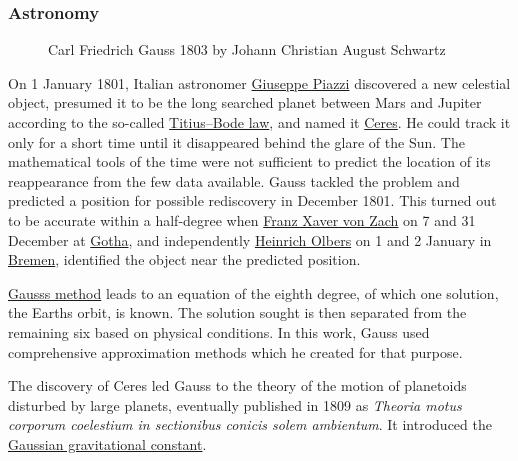 \subsubsection{Astronomy}\label{Astronomy}

\begin{figure}
\centering
\caption{Carl Friedrich Gauss 1803 by Johann Christian August Schwartz}\label{mwBl0}
\end{figure}

On 1 January 1801, Italian astronomer \href{https://en.wikipedia.org/wiki/Giuseppe_Piazzi}{Giuseppe Piazzi} discovered a new celestial object, presumed it to be the long searched planet between Mars and Jupiter according to the so-called \href{https://en.wikipedia.org/wiki/Titius–Bode_law}{Titius--Bode law}, and named it \href{https://en.wikipedia.org/wiki/Ceres_(dwarf_planet)}{Ceres}. He could track it only for a short time until it disappeared behind the glare of the Sun. The mathematical tools of the time were not sufficient to predict the location of its reappearance from the few data available. Gauss tackled the problem and predicted a position for possible rediscovery in December 1801. This turned out to be accurate within a half-degree when \href{https://en.wikipedia.org/wiki/Franz_Xaver_von_Zach}{Franz Xaver von Zach} on 7 and 31 December at \href{https://en.wikipedia.org/wiki/Gotha_Observatory}{Gotha}, and independently \href{https://en.wikipedia.org/wiki/Heinrich_Wilhelm_Matthäus_Olbers}{Heinrich Olbers} on 1 and 2 January in \href{https://en.wikipedia.org/wiki/Bremen}{Bremen}, identified the object near the predicted position.

\href{https://en.wikipedia.org/wiki/Gauss's_method}{Gauss\textquotesingle s method} leads to an equation of the eighth degree, of which one solution, the Earth\textquotesingle s orbit, is known. The solution sought is then separated from the remaining six based on physical conditions. In this work, Gauss used comprehensive approximation methods which he created for that purpose.

The discovery of Ceres led Gauss to the theory of the motion of planetoids disturbed by large planets, eventually published in 1809 as \emph{Theoria motus corporum coelestium in sectionibus conicis solem ambientum}. It introduced the \href{https://en.wikipedia.org/wiki/Gaussian_gravitational_constant}{Gaussian gravitational constant}.

